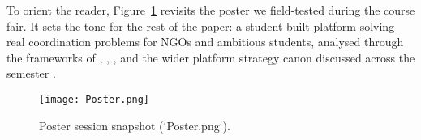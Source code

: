 \documentclass[12pt,a4paper]{article}
\begin{document}
To orient the reader, Figure~\ref{fig:intro-showcase} revisits the poster we field-tested during the course fair. It sets the tone for the rest of the paper: a student-built platform solving real coordination problems for NGOs and ambitious students, analysed through the frameworks of \citet{Choudary2016}, \citet{Srnicek2017}, \citet{Reillier2017}, and the wider platform strategy canon discussed across the semester \citep{Lecture01,Lecture03,Lecture05}.

\begin{figure}[H]
  \centering
  \texttt{[image: Poster.png]}
  \caption{Poster session snapshot (`Poster.png`).}
  \label{fig:intro-showcase}
\end{figure}












\newpage


\end{document}
